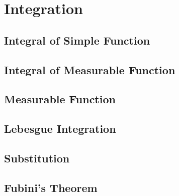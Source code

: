 \chapter{Integration}

\section{Integral of Simple Function}

\section{Integral of Measurable Function}

\section{Measurable Function}

\section{Lebesgue Integration}

\section{Substitution}

\section{Fubini’s Theorem}




